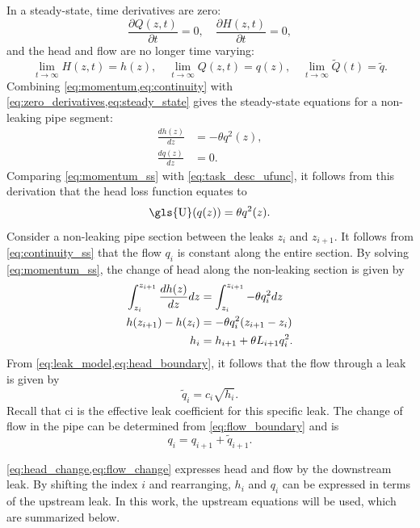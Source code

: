 In a steady-state, time derivatives are zero:
\begin{equation}\label{eq:zero_derivatives}
    \frac{\partial Q(z,t)}{\partial t}=0, \quad \frac{\partial H(z,t)}{\partial t}=0,
\end{equation}
and the head and flow are no longer time varying:
\begin{equation}\label{eq:steady_state}
    \lim_{t\rightarrow\infty} H(z,t)=h(z), \quad \lim_{t\rightarrow\infty} Q(z,t)=q(z), \quad \lim_{t\rightarrow\infty} \tilde{Q}(t)=\tilde{q}.
\end{equation}
Combining \cref{eq:momentum,eq:continuity} with \cref{eq:zero_derivatives,eq:steady_state} gives the steady-state equations for a non-leaking pipe segment:
\begin{align}
\label{eq:momentum_ss}
\frac{d h(z)}{d z} &= -\theta q^{2}(z),\\
\label{eq:continuity_ss}
\frac{d q(z)}{d z} &= 0.
\end{align}
Comparing \cref{eq:momentum_ss} with \cref{eq:task_desc_ufunc}, it follows from this derivation that the head loss function equates to
\[
    \text{\gls{U}} (q(z)) = \theta q^{2}(z).
\]
Consider a non-leaking pipe section between the leaks $z_i$ and $z_{i+1}$. It follows from \cref{eq:continuity_ss} that the flow $q_i$ is constant along the entire section. By solving \cref{eq:momentum_ss},  the change of head along the non-leaking section is given by
\begin{align}
    \int_{z_i}^{z_{i+1}} \frac{d h(z)}{d z} dz &= \int_{z_i}^{z_{i+1}} -\theta q_i^{2} dz  \notag \\
    h(z_{i+1}) - h(z_i) &= -\theta q_i^{2} (z_{i+1}-z_i) \notag \\ 
    h_i &= h_{i+1} + \theta L_{i+1} q_i^{2} \label{eq:head_change}.
\end{align}
From \cref{eq:leak_model,eq:head_boundary}, it follows that the flow through a leak is given by
\begin{equation*}
    \tilde{q}_i = c_i\sqrt{h_i}.
\end{equation*}
Recall that \gls{ci} is the effective leak coefficient for this specific leak. The change of flow in the pipe can be determined from \cref{eq:flow_boundary} and is
\begin{equation} \label{eq:flow_change}
    q_{i} = q_{i+1}+\tilde{q}_{i+1}.
\end{equation}

\cref{eq:head_change,eq:flow_change} expresses head and flow by the downstream leak. By shifting the index $i$ and rearranging, $h_i$ and $q_i$ can be expressed in terms of the upstream leak. In this work, the upstream equations will be used, which are summarized below.

